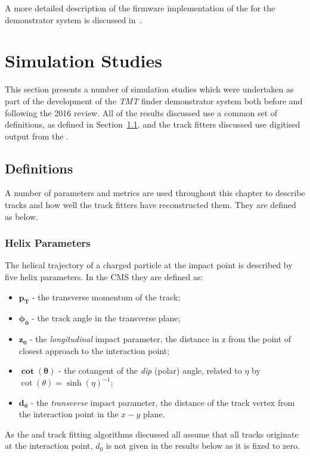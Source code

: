 A more detailed description of the firmware implementation of the \DR for the demonstrator system is discussed in~\cite{TMTT_JINST}.

\section{Simulation Studies}\label{sec:TmttSimStudies}
This section presents a number of simulation studies which were undertaken as part of the development of the \emph{TMT} finder demonstrator system both before and following the 2016 review.
All of the results discussed use a common set of definitions, as defined in Section~\ref{subsec:helixParameter}, and the track fitters discussed use digitised output from the \HT.

\subsection{Definitions}\label{subsec:helixParameter}
A number of parameters and metrics are used throughout this chapter to describe tracks and how well the track fitters have reconstructed them.
They are defined as below.

\subsubsection{Helix Parameters}
The helical trajectory of a charged particle at the impact point is described by five helix parameters.
In the CMS they are defined as:

\begin{itemize}
\item $\mathbf{p_{T}}$ - the transverse momentum of the track;
\item $\mathbf{\phi_{0}}$ - the track angle in the transverse plane;
\item $\mathbf{z_{0}}$ - the \emph{longitudinal} impact parameter, \ie the distance in z from the point of closest approach to the interaction point;
\item $\mathbf{\cot(\theta)}$ - the cotangent of the \emph{dip} (polar) angle, related to $\eta$ by $\cot(\theta) = \sinh (\eta)^{-1}$;
\item $\mathbf{d_{0}}$ - the \emph{transverse} impact parameter, \ie the distance of the track vertex from the interaction point in the $x-y$ plane. 
\end{itemize}

As the \HT and track fitting algorithms discussed all assume that all tracks originate at the interaction point, $d_{0}$ is not given in the results below as it is fixed to zero.

